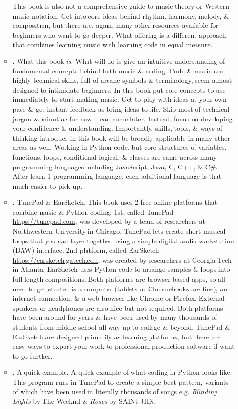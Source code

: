 \documentclass{article}
\begin{document}
\begin{itemize}
\begin{itemize}
		This book is also not a comprehensive guide to music theory or Western music notation. Get into core ideas behind rhythm, harmony, melody, \& composition, but there are, again, many other resources available for beginners who want to go deeper. What offering is a different approach that combines learning music with learning code in equal measure.
		\item {. What this book {\it is}.} What will do is give an intuitive understanding of fundamental concepts behind both music \& coding. Code \& music are highly technical skills, full of arcane symbols \& terminology, seem almost designed to intimidate beginners. In this book put core concepts to use immediately to start making music. Get to play with ideas at your own pace \& get instant feedback as bring ideas to life. Skip most of technical jargon \& minutiae for now -- can come later. Instead, focus on developing your confidence \& understanding. Importantly, skills, tools, \& ways of thinking introduce in this book will be broadly applicable in many other areas as well. Working in Python code, but core structures of variables, functions, loops, conditional logical, \& classes are same across many programming languages including JavaScript, Java, C, C++, \& C\#. After learn 1 programming language, each additional language is that much easier to pick up.
		\item {. TunePad \& EarSketch.} This book uses 2 free online platforms that combine music \& Python coding. 1st, called TunePad \url{https://tunepad.com}, was developed by a team of researchers at Northwestern University in Chicago. TunePad lets create short musical loops that you can layer together using a simple digital audio workstation (DAW) interface. 2nd platform, called EarSketch \url{https://earsketch.gatech.edu}, was created by researchers at Georgia Tech in Atlanta. EarSketch uses Python code to arrange samples \& loops into full-length compositions. Both platforms are browser-based apps, so all need to get started is a computer (tablets or Chromebooks are fine), an internet connection, \& a web browser like Chrome or Firefox. External speakers or headphones are also nice but not required. Both platforms have been around for years \& have been used by many thousands of students from middle school all way up to college \& beyond. TunePad \& EarSketch are designed primarily as learning platforms, but there are easy ways to export your work to professional production software if want to go further.
		\item {. A quick example.} A quick example of what coding in Python looks like. This program runs in TunePad to create a simple beat pattern, variants of which have been used in literally thousands of songs e.g. {\it Blinding Lights} by The Weeknd \& {\it Roses} by SAINt JHN.

\end{itemize}
\end{itemize}
\end{document}
